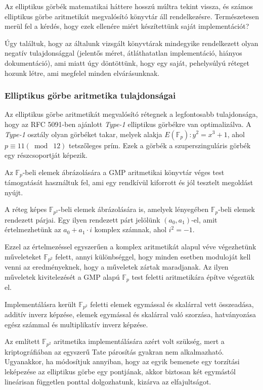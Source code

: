 Az elliptikus görbék matematikai háttere hosszú múltra tekint vissza, és számos elliptikus görbe aritmetikát megvalósító könyvtár áll rendelkezésre. Természetesen merül fel a kérdés, hogy ezek ellenére miért készítettünk saját implementációt?

Úgy találtuk, hogy az általunk vizsgált könyvtárak mindegyike rendelkezett olyan negatív tulajdonsággal (jelentős méret, átláthatatlan implementáció, hiányos dokumentáció), ami miatt úgy döntöttünk, hogy egy saját, pehelysúlyú réteget hozunk létre, ami megfelel minden elvárásunknak.

\subsubsection{Elliptikus görbe aritmetika tulajdonságai}

Az elliptikus görbe aritmetikát megvalósító rétegnek a legfontosabb tulajdonsága, hogy az RFC 5091-ben ajánlott \textit{Type-1} elliptikus görbékre van optimalizálva. A \textit{Type-1} osztály olyan görbéket takar, melyek alakja $E(\mathbb{F}_p) : y^2 = x^3 + 1$, ahol  $p \equiv 11 (\bmod \; 12)$ tetszőleges prím. Ezek a görbék a szuperszinguláris görbék egy részcsoportját képezik.

Az $\mathbb{F}_p$-beli elemek ábrázolására a GMP aritmetikai könyvtár véges test támogatását használtuk fel, ami egy rendkívül kiforrott és jól tesztelt megoldást nyújt.

A réteg képes $\mathbb{F}_{p^2}$-beli elemek ábrázolására is, amelyek lényegében $\mathbb{F}_p$-beli elemek rendezett párjai. Egy ilyen rendezett párt jelölünk $(a_0, a_1)$-el, amit értelmezhetünk az $a_0 + a_1 \cdot i$ komplex számnak, ahol $i^2 = -1$. 

Ezzel az értelmezéssel egyszerűen a komplex aritmetikát alapul véve végezhetünk műveleteket $\mathbb{F}_{p^2}$ felett, annyi különbséggel, hogy minden esetben moduloját kell venni az eredményeknek, hogy a műveletek zártak maradjanak. Az ilyen műveletek kivitelezését a GMP alapú $\mathbb{F}_p$ test feletti aritmetikára építve végeztük el. 

Implementálásra került $\mathbb{F}_{p^2}$ feletti elemek egymással és skalárral vett összeadása, additív inverz képzése, elemek egymással és skalárral való szorzása, hatványozása egész számmal és multiplikatív inverz képzése.

Az említett $\mathbb{F}_{p^2}$ aritmetika implementálására azért volt szükség, mert a kriptográfiában az egyszerű Tate párosítás gyakran nem alkalmazható. Ugyanakkor, ha módosítjuk annyiban, hogy az egyik bemenete egy torzítási leképezése az elliptikus görbe egy pontjának, akkor biztosan két egymástól lineárisan független ponttal dolgozhatunk, kizárva az elfajultságot.

